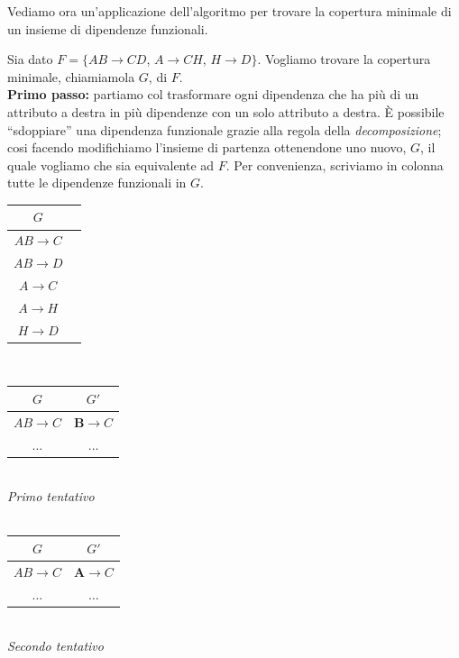  Vediamo ora un'applicazione dell'algoritmo per trovare la copertura minimale di un insieme di dipendenze funzionali.
\begin{exmp}
Sia dato $F = \{AB\rightarrow CD$, $A\rightarrow CH$, $H\rightarrow D\}$. Vogliamo trovare la copertura minimale, chiamiamola $G$, di $F$.\\

\noindent \textbf{Primo passo:} partiamo col trasformare ogni dipendenza che ha più di un attributo a destra in più dipendenze
con un solo attributo a destra. \`E possibile ``sdoppiare'' una dipendenza funzionale grazie alla regola della \emph{decomposizione};
cosi facendo modifichiamo l'insieme di partenza ottenendone uno nuovo, $G$, il quale vogliamo che sia equivalente ad $F$.
Per convenienza, scriviamo in colonna tutte le dipendenze funzionali in $G$.

\begin{multicols}{3}
\begin{tabular}{|c|c|}
  \hline
  $G$\\
  \hline
  $AB\rightarrow C$ \\
  $AB\rightarrow D$ \\
  $A\rightarrow C$ \\
  $A\rightarrow H$ \\
  $H\rightarrow D$ \\
  \hline
 \end{tabular}\\
 
 \begin{tabular}{|c|c|}
  \hline
  $G$ & $G'$\\
  \hline
  $AB\rightarrow C$ & $\mathbf{B}\rightarrow C$\\
  $\ldots$ & $\ldots$ \\
  \hline
 \end{tabular}\\
 
 \emph{\small Primo tentativo}\\\\

 \begin{tabular}{|c|c|}
  \hline
  $G$ & $G'$\\
  \hline
  $AB\rightarrow C$ & $\mathbf{A}\rightarrow C$\\
  $\ldots$ & $\ldots$ \\
  \hline
 \end{tabular}\\
  
  \emph{\small Secondo tentativo}\\
\end{multicols}


\end{exmp}
